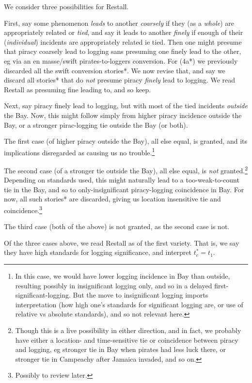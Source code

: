 \documentclass{amsart}
\newcommand{\ment}[1]{\textit{#1}} %
\theoremstyle{definition}
\theoremstyle{remark}
\begin{document}
		We consider three possibilities for Restall. 
		
		First, say some phenomenon \ment{leads} to another \ment{coarsely} if they (as a \emph{whole}) are appropriately related or \ment{tied}, and say it leads to another \ment{finely} if enough of their (\emph{individual}) incidents are appropriately related ie tied. Then one might presume that piracy coarsely lead to logging sans presuming one finely lead to the other, eg via an en masse/swift pirates-to-loggers conversion. For (4a*) we previously discarded all the swift conversion stories*. We now revise that, and say we discard all stories* that do \emph{not} presume piracy \emph{finely} lead to logging. We read Restall as presuming fine leading to, and so keep.
		
		Next, say piracy finely lead to logging, but with most of the tied incidents \emph{outside} the Bay. Now, this might follow simply from higher piracy incidence outside the Bay, or a stronger pirac-logging tie outside the Bay (or both).
		
		The first case (of higher piracy outside the Bay), all else equal, is granted, and its implications disregarded as causing us no trouble.\footnote{In this case, we would have lower logging incidence in Bay than outside, resulting possibly in insignificant logging only, and so in a delayed first-significant-logging. But the move to insignificant logging imports interpretation (how high one's standards for significant logging are, or use of relative vs absolute standards), and so not relevant here.}
		
		The second case (of a stronger tie outside the Bay), all else equal, is \emph{not} granted.\footnote{Though this is a live possibility in either direction, and in fact, we probably have either a location- and time-sensitive tie or coincidence between piracy and logging, eg stronger tie in Bay when pirates had less luck there, or stronger tie in Campeachy after Jamaica invaded, and so on.} Depending on standards used, this might naturally lead to a too-weak-to-count tie in the Bay, and so to only-insignificant piracy-logging coincidence in Bay. For now, all such stories* are discarded, giving us location insensitive tie and coincidence.\footnote{Possibly to review later.}
		
		The third case (both of the above) is not granted, as the second case is not.
		
		Of the three cases above, we read Restall as of the first variety. That is, we say they have high standards for logging significance, and interpret \(t_c^*=t_1\).
		
\end{document}
